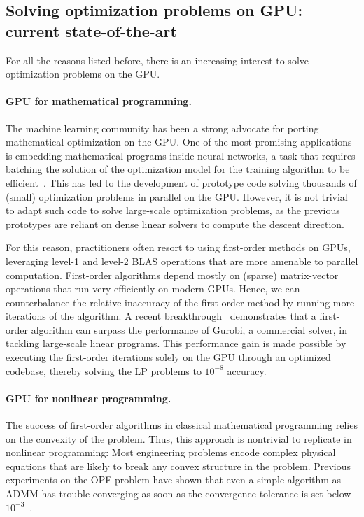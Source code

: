 \subsection{Solving optimization problems on GPU: current state-of-the-art}
For all the reasons listed before, there is an increasing interest
to solve optimization problems on the GPU.


\paragraph{GPU for mathematical programming.}
The machine learning community has been a strong advocate for porting
mathematical optimization on the GPU. One of the most promising
applications is embedding mathematical programs inside neural networks,
a task that requires batching the solution of the optimization model
for the training algorithm to be
efficient~\cite{amos2017optnet,pineda2022theseus}.  This has led to
the development of prototype code solving thousands of (small)
optimization problems in parallel on the GPU.  However, it is not
trivial to adapt such code to solve large-scale optimization problems,
as the previous prototypes are reliant on dense linear solvers to
compute the descent direction.

For this reason, practitioners often resort to using first-order
methods on GPUs, leveraging level-1 and level-2 BLAS operations that
are more amenable to parallel computation.
First-order algorithms depend mostly on (sparse) matrix-vector operations that run
very efficiently on modern GPUs. Hence, we can counterbalance
the relative inaccuracy of the first-order method by running more
iterations of the algorithm.
A recent breakthrough~\cite{lu2023cupdlp,lu2023cupdlp2} demonstrates
that a first-order algorithm can surpass the performance of Gurobi, a
commercial solver, in tackling large-scale linear programs. This
performance gain is made possible by executing the first-order
iterations solely on the GPU through an optimized codebase, thereby
solving the LP problems to $10^{-8}$ accuracy.


\paragraph{GPU for nonlinear programming.}
The success of first-order algorithms in classical mathematical programming
relies on the convexity of the problem. Thus, this approach is nontrivial to replicate
in nonlinear programming: Most engineering problems encode complex
physical equations that are likely to break any convex structure in the problem.
Previous experiments on the OPF problem have shown that even a simple
algorithm as ADMM has trouble converging as soon as the convergence
tolerance is set below $10^{-3}$~\cite{kim2021leveraging}.

